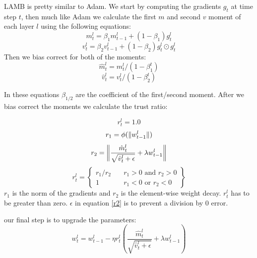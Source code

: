 \documentclass[twocolumn,10pt]{article}
\DeclarePairedDelimiter\norm{\lVert}{\rVert}
\begin{document}
LAMB is pretty similar to Adam. We start by computing the gradients $g_t$ at time step $t$, then much like Adam we calculate the first $m$ and second $v$ moment of each layer $l$ using the following equations:
\begin{equation*} \label{1mom}
m^l_t = \beta _1 m^l_{t-1} + (1-\beta _1) g^l_t
\end{equation*}
\begin{equation*} \label{2mom}
v^l_t = \beta _2 v^l_{t-1} + (1-\beta _2) g^l_t \odot g^l_t
\end{equation*}
Then we bias correct for both of the moments:
\begin{equation*} \label{b1}
\hat{m}^l_t = m^l_t /(1-\beta ^t_1)
\end{equation*}
\begin{equation*} \label{b2}
\hat{v}^l_t = v^l_t /(1-\beta ^t_2)
\end{equation*}

In these equations $\beta _{1/2}$ are the coefficient of the first/second moment. After we bias correct the moments we calculate the trust ratio:

\begin{equation*}
r^l_t = 1.0
\end{equation*}
\begin{equation*}
r_1 = \phi(\norm{w^l_{t-1}})
\end{equation*}
\begin{equation*}\label{r2}
r_2= \norm[\bigg]{\frac{\hat{m}^l_t}{\sqrt{\hat{v}^l_t + \epsilon}} + \lambda w^l_{t-1}}
\end{equation*}
\begin{equation*}
r^l_t =
\left\{
	\begin{array}{cc}
		r_1/r_2 & \quad r_1 > 0 \text{ and } r_2 > 0 \\
		1 & \quad r_1 < 0 \text{ or } r_2 < 0
	\end{array}
\right\}
\end{equation*}
$r_1$ is the norm of the gradients and $r_2$ is the element-wise weight decay. $r^l_t$ has to be greater than zero. $\epsilon$ in equation \ref{r2} is to prevent a division by 0 error.

our final step is to upgrade the parameters:
\begin{equation*}
w^l_t = w^l_{t-1} - \eta r^l_t  \left(\frac{\hat{m}^l_t}{\sqrt{\hat{v}^l_t + \epsilon}} 
+ \lambda w^l_{t-1}\right)
\end{equation*}
\end{document}
